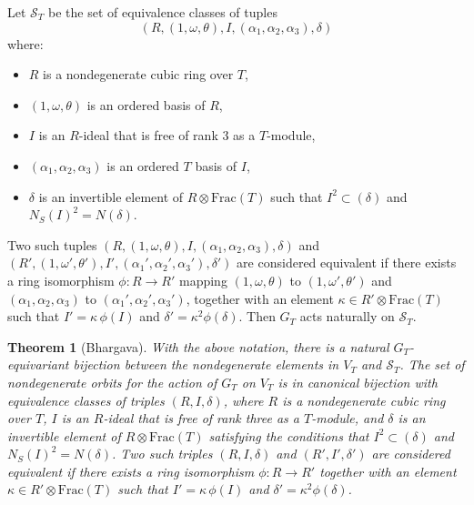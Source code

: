 \documentclass[table]{amsart}
\newtheorem{theorem}{Theorem}[section]
\newcommand{\Frac}{\mathrm{Frac}}
\numberwithin{equation}{section}
\begin{document}
\par Let $\mathcal{S}_T$ be the set of equivalence classes of tuples
\[\left(R, (1, \omega, \theta), I, (\alpha_1, \alpha_2, \alpha_3),\delta\right)\] where:
\begin{itemize}
    \item $R$ is a nondegenerate cubic ring over $T$,
    \item $(1, \omega, \theta)$ is an ordered basis of $R$,
    \item $I$ is an
$R$-ideal that is free of rank $3$ as a $T$-module,
\item $(\alpha_1,\alpha_2, \alpha_3)$ is an ordered $T$ basis of $I$,
\item $\delta$ is an
invertible element of $R \otimes \Frac(T)$ such that $I^2 \subset (\delta)$ and $N_S(I)^2 = N(\delta)$.
\end{itemize}
Two such tuples
$(R,(1, \omega, \theta), I,(\alpha_1, \alpha_2, \alpha_3), \delta)$ and $(R',(1, \omega', \theta'),I',(\alpha_1', \alpha_2', \alpha_3'),\delta')$ are considered equivalent if there exists
a ring isomorphism $\phi \colon R \to R'$ mapping $(1, \omega, \theta)$ to $(1, \omega', \theta')$ and $(\alpha_1, \alpha_2, \alpha_3)$ to $(\alpha_1', \alpha_2', \alpha_3')$, together with an element
$\kappa \in R' \otimes \Frac(T)$ such that $I' = \kappa\,\phi(I)$ and
$\delta' = \kappa^2 \phi(\delta)$. Then $G_T$ acts naturally on $\mathcal{S}_T$. 

\begin{theorem}[Bhargava]
With the above notation, there is a natural $G_T$-equivariant bijection between the nondegenerate elements in $V_T$ and $\mathcal{S}_T$. The set of nondegenerate orbits for the action of
$G_T$ on $V_T$ is in canonical bijection with equivalence classes of triples
$(R,I,\delta)$, where $R$ is a nondegenerate cubic ring over $T$, $I$ is an
$R$-ideal that is free of rank three as a $T$-module, and $\delta$ is an
invertible element of $R \otimes \Frac(T)$ satisfying the conditions that
$I^2 \subset (\delta)$ and $N_S(I)^2 = N(\delta)$. Two such triples
$(R,I,\delta)$ and $(R',I',\delta')$ are considered equivalent if there exists
a ring isomorphism $\phi \colon R \to R'$ together with an element
$\kappa \in R' \otimes \Frac(T)$ such that $I' = \kappa\,\phi(I)$ and
$\delta' = \kappa^2 \phi(\delta)$.
\end{theorem}
\end{document}
